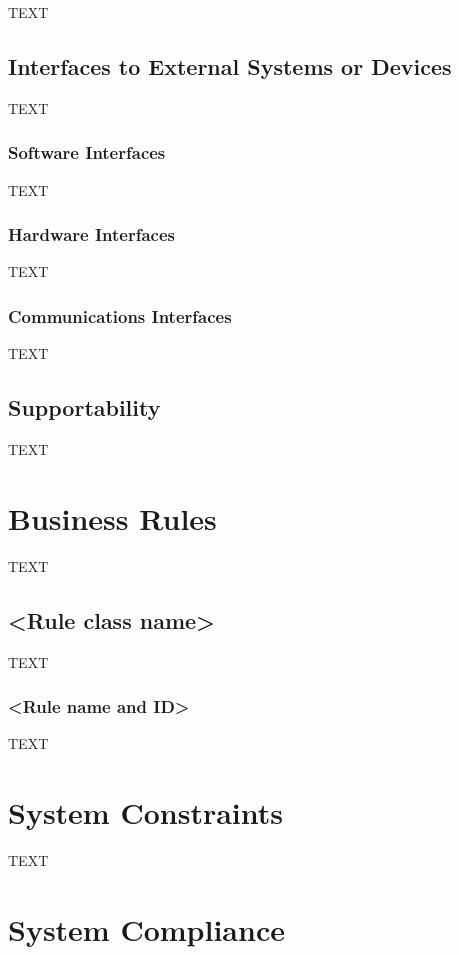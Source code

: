 TEXT

\subsection{Interfaces to External Systems or Devices}

TEXT

\subsubsection{Software Interfaces}

TEXT

\subsubsection{Hardware Interfaces}

TEXT

\subsubsection{Communications Interfaces}

TEXT

\subsection{Supportability}

TEXT

\section{Business Rules}

TEXT

\subsection{<Rule class name>}

TEXT

\subsubsection{<Rule name and ID>}

TEXT

\section{System Constraints}

TEXT

\section{System Compliance}

